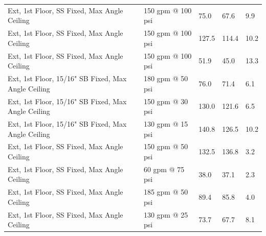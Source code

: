 \documentclass{article}
\begin{document}
\begin{table}[]
\begin{tabular}{lllll}
Ext, 1st Floor, SS Fixed, Max Angle Ceiling           & 150 gpm @ 100 psi                   & 75.0                                   & 67.6                                    & 9.9                                     \\
Ext, 1st Floor, SS Fixed, Max Angle Ceiling           & 150 gpm @ 100 psi                   & 127.5                                  & 114.4                                   & 10.2                                    \\
Ext, 1st Floor, SS Fixed, Max Angle Ceiling           & 150 gpm @ 100 psi                   & 51.9                                   & 45.0                                    & 13.3                                    \\
Ext, 1st Floor, 15/16" SB Fixed, Max Angle Ceiling    & 180 gpm @ 50 psi                    & 76.0                                   & 71.4                                    & 6.1                                     \\
Ext, 1st Floor, 15/16" SB Fixed, Max Angle Ceiling    & 150 gpm @ 30 psi                    & 130.0                                  & 121.6                                   & 6.5                                     \\
Ext, 1st Floor, 15/16" SB Fixed, Max Angle Ceiling    & 130 gpm @ 15 psi                    & 140.8                                  & 126.5                                   & 10.2                                    \\
Ext, 1st Floor, SS Fixed, Max Angle Ceiling           & 150 gpm @ 50 psi                    & 132.5                                  & 136.8                                   & 3.2                                     \\
Ext, 1st Floor, SS Fixed, Max Angle Ceiling           & 60 gpm @ 75 psi                     & 38.0                                   & 37.1                                    & 2.3                                     \\
Ext, 1st Floor, SS Fixed, Max Angle Ceiling           & 185 gpm @ 50 psi                    & 89.4                                   & 85.8                                    & 4.0                                     \\
Ext, 1st Floor, SS Fixed, Max Angle Ceiling           & 130 gpm @ 25 psi                    & 73.7                                   & 67.7                                    & 8.1                                     \\

\end{tabular}
\end{table}
\end{document}
